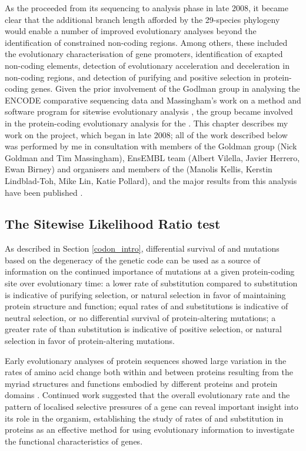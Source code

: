 As the \mgp proceeded from its sequencing to analysis phase in late
2008, it became clear that the additional branch length afforded by
the 29-species phylogeny would enable a number of improved
evolutionary analyses beyond the identification of constrained
non-coding regions. Among others, these included the evolutionary
characterisation of gene promoters, identification of exapted
non-coding elements, detection of evolutionary acceleration and
deceleration in non-coding regions, and detection of purifying and
positive selection in protein-coding genes. Given the prior
involvement of the Godlman group in analysing the ENCODE comparative
sequencing data \citep{Margulies2007,ENCODE_Project_Consortium2007a}
and Massingham's work on a method and software program for sitewise
evolutionary analysis \citep{Massingham2005}, the group became
involved in the protein-coding evolutionary analysis for the
\mgp. This chapter describes my work on the project, which began in
late 2008; all of the work described below was performed by me in
consultation with members of the Goldman group (Nick Goldman and Tim
Massingham), EnsEMBL team (Albert Vilella, Javier Herrero, Ewan
Birney) and organisers and members of the \mgp (Manolis Kellis,
Kerstin Lindblad-Toh, Mike Lin, Katie Pollard), and the major results
from this analysis have been published \citep{LindbladToh2011}.

\subsection{The Sitewise Likelihood Ratio test}

As described in Section \ref{codon_intro}, differential survival of \nsyn
and \syn mutations based on the degeneracy of the genetic code can be
used as a source of information on the continued importance of
mutations at a given protein-coding site over evolutionary time: a
lower rate of \nsyn substitution compared to \syn substitution is
indicative of purifying selection, or natural selection in favor of
maintaining protein structure and function; equal rates of \nsyn and
\syn substitutions is indicative of neutral selection, or no
differential survival of protein-altering mutations; a greater rate of
\nsyn than \syn substitution is indicative of positive selection, or
natural selection in favor of protein-altering mutations.

Early evolutionary analyses of protein sequences showed large
variation in the rates of amino acid change both within and between
proteins resulting from the myriad structures and functions embodied
by different proteins and protein domains
\citep{Kimura1974}. Continued work suggested that the overall
evolutionary rate \cite{Koonin2006a} and the pattern of localised
selective pressures \cite{Yang1998a,Nielsen1998} of a gene can reveal
important insight into its role in the organism, establishing the
study of rates of \nsyn and \syn substitution in proteins as an
effective method for using evolutionary information to investigate the
functional characteristics of genes.

